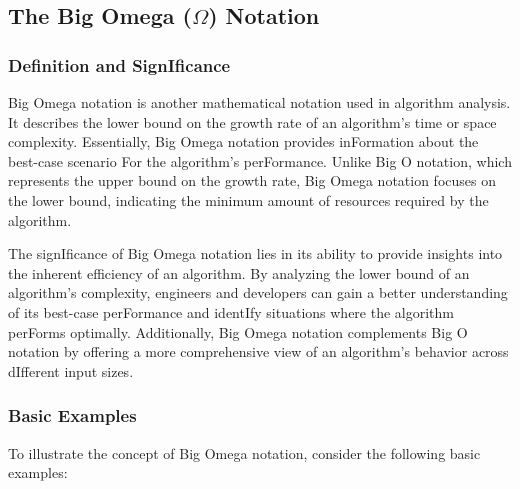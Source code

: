 \documentclass[12pt]{book} %
\begin{document}
\subsection{The Big Omega (\(\Omega\)) Notation}

\subsubsection{Definition and SignIficance}

Big Omega notation is another mathematical notation used in algorithm analysis. It describes the lower bound on the growth rate of an algorithm's time or space complexity. Essentially, Big Omega notation provides inFormation about the best-case scenario For the algorithm's perFormance. Unlike Big O notation, which represents the upper bound on the growth rate, Big Omega notation focuses on the lower bound, indicating the minimum amount of resources required by the algorithm.

The signIficance of Big Omega notation lies in its ability to provide insights into the inherent efficiency of an algorithm. By analyzing the lower bound of an algorithm's complexity, engineers and developers can gain a better understanding of its best-case perFormance and identIfy situations where the algorithm perForms optimally. Additionally, Big Omega notation complements Big O notation by offering a more comprehensive view of an algorithm's behavior across dIfferent input sizes.

\subsubsection{Basic Examples}

To illustrate the concept of Big Omega notation, consider the following basic examples:
\end{document}
